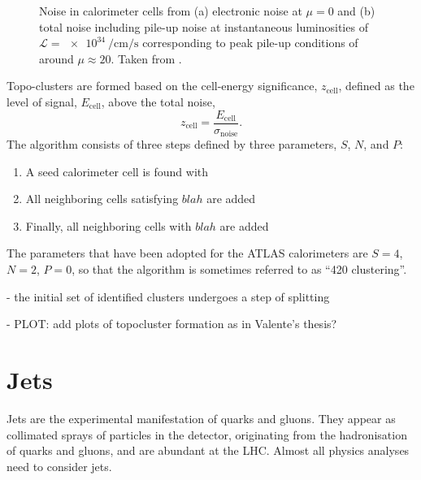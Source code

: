 \begin{figure}
        
\caption{Noise in calorimeter cells from (a) electronic noise at $\mu=0$ and (b) total noise including pile-up noise at instantaneous luminosities of $\mathcal{L} = \SI{e34}{\per\cm\per\s}$ corresponding to peak pile-up conditions of around $\mu\approx20$. Taken from .}
\end{figure}


Topo-clusters are formed based on the cell-energy significance, $z_{\text{cell}}$, defined as the level of signal, $E_{\text{cell}}$, above the total noise, 
\begin{equation}
    z_{\text{cell}} = \frac{E_{\text{cell}}}{\sigma_{\text{noise}}}. 
\end{equation}
The algorithm consists of three steps defined by three parameters, $S$, $N$, and $P$:

\begin{enumerate}
    \item A seed calorimeter cell is found with 
    \item All neighboring cells satisfying $blah$ are added
    \item Finally, all neighboring cells with $blah$ are added
\end{enumerate}

The parameters that have been adopted for the ATLAS calorimeters are $S = 4$, $N = 2$, $P = 0$, so that the algorithm is sometimes referred to as ``420 clustering''. 

- the initial set of identified clusters undergoes a step of splitting

- PLOT: add plots of topocluster formation as in Valente's thesis?




\section{Jets}
Jets are the experimental manifestation of quarks and gluons.
They appear as collimated sprays of particles in the detector, originating from the hadronisation of quarks and gluons, and are abundant at the LHC. Almost all physics analyses need to consider jets.

